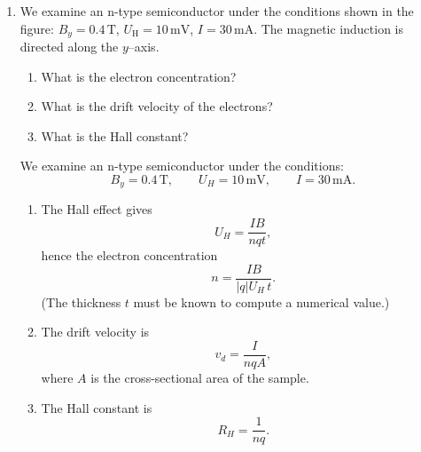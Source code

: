 \documentclass[a4paper,12pt]{letter}
\begin{document}
\begin{enumerate}
 \item We examine an n-type semiconductor under the conditions shown in the figure:  
  $B_{y} = 0.4\,\text{T}$, $U_{\text{H}} = 10\,\text{mV}$, $I = 30\,\text{mA}$.  
  The magnetic induction is directed along the $y$–axis.

  \begin{enumerate}
    \item What is the electron concentration?
    \item What is the drift velocity of the electrons?
    \item What is the Hall constant?
  \end{enumerate}

\smallskip
We examine an n-type semiconductor under the conditions:
\[
B_y = 0.4\,\text{T}, \qquad
U_H = 10\,\text{mV}, \qquad
I = 30\,\text{mA}.
\]

\begin{enumerate}
    \item 
    The Hall effect gives
    \[
    U_H = \frac{I B}{n q t},
    \]
    hence the electron concentration
    \[
    n = \frac{I B}{|q| U_H\, t}.
    \]
    (The thickness $t$ must be known to compute a numerical value.)

    \item 
    The drift velocity is
    \[
    v_d = \frac{I}{n q A},
    \]
    where $A$ is the cross-sectional area of the sample.

    \item 
    The Hall constant is
    \[
    R_H = \frac{1}{n q}.
    \]
\end{enumerate}

\end{enumerate}
\end{document}

